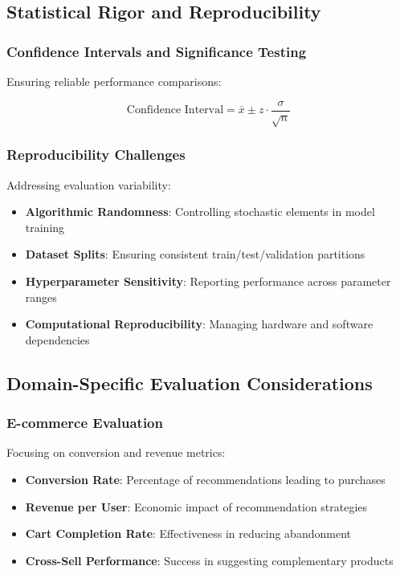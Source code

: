 \documentclass[acmsmall,review,anonymous]{acmart}
\begin{document}
\subsection{Statistical Rigor and Reproducibility}

\subsubsection{Confidence Intervals and Significance Testing}

Ensuring reliable performance comparisons:

\begin{equation}
\text{Confidence Interval} = \bar{x} \pm z \cdot \frac{\sigma}{\sqrt{n}}
\label{eq:confidence_interval}
\end{equation}

\subsubsection{Reproducibility Challenges}

Addressing evaluation variability:

\begin{itemize}
    \item \textbf{Algorithmic Randomness}: Controlling stochastic elements in model training
    \item \textbf{Dataset Splits}: Ensuring consistent train/test/validation partitions
    \item \textbf{Hyperparameter Sensitivity}: Reporting performance across parameter ranges
    \item \textbf{Computational Reproducibility}: Managing hardware and software dependencies
\end{itemize}

\subsection{Domain-Specific Evaluation Considerations}

\subsubsection{E-commerce Evaluation}

Focusing on conversion and revenue metrics:

\begin{itemize}
    \item \textbf{Conversion Rate}: Percentage of recommendations leading to purchases
    \item \textbf{Revenue per User}: Economic impact of recommendation strategies
    \item \textbf{Cart Completion Rate}: Effectiveness in reducing abandonment
    \item \textbf{Cross-Sell Performance}: Success in suggesting complementary products
\end{itemize}
\end{document}
